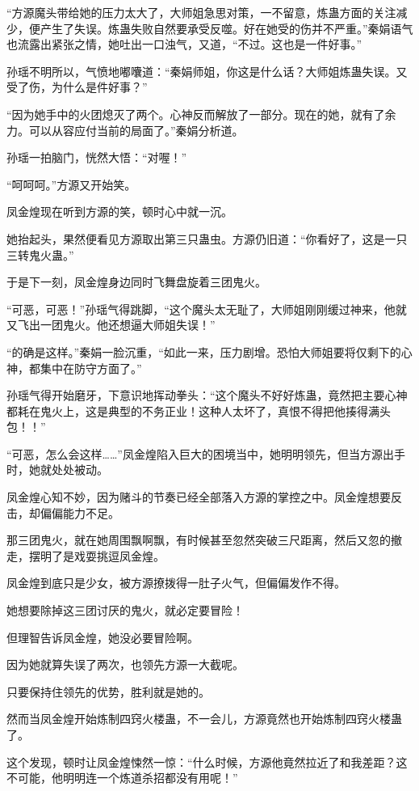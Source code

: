 \begin{this_body}
“方源魔头带给她的压力太大了，大师姐急思对策，一不留意，炼蛊方面的关注减少，便产生了失误。炼蛊失败自然要承受反噬。好在她受的伤并不严重。”秦娟语气也流露出紧张之情，她吐出一口浊气，又道，“不过。这也是一件好事。”

孙瑶不明所以，气愤地嘟囔道：“秦娟师姐，你这是什么话？大师姐炼蛊失误。又受了伤，为什么是件好事？”

“因为她手中的火团熄灭了两个。心神反而解放了一部分。现在的她，就有了余力。可以从容应付当前的局面了。”秦娟分析道。

孙瑶一拍脑门，恍然大悟：“对喔！”

“呵呵呵。”方源又开始笑。

凤金煌现在听到方源的笑，顿时心中就一沉。

她抬起头，果然便看见方源取出第三只蛊虫。方源仍旧道：“你看好了，这是一只三转鬼火蛊。”

于是下一刻，凤金煌身边同时飞舞盘旋着三团鬼火。

“可恶，可恶！”孙瑶气得跳脚，“这个魔头太无耻了，大师姐刚刚缓过神来，他就又飞出一团鬼火。他还想逼大师姐失误！”

“的确是这样。”秦娟一脸沉重，“如此一来，压力剧增。恐怕大师姐要将仅剩下的心神，都集中在防守方面了。”

孙瑶气得开始磨牙，下意识地挥动拳头：“这个魔头不好好炼蛊，竟然把主要心神都耗在鬼火上，这是典型的不务正业！这种人太坏了，真恨不得把他揍得满头包！！”

“可恶，怎么会这样……”凤金煌陷入巨大的困境当中，她明明领先，但当方源出手时，她就处处被动。

凤金煌心知不妙，因为赌斗的节奏已经全部落入方源的掌控之中。凤金煌想要反击，却偏偏能力不足。

那三团鬼火，就在她周围飘啊飘，有时候甚至忽然突破三尺距离，然后又忽的撤走，摆明了是戏耍挑逗凤金煌。

凤金煌到底只是少女，被方源撩拨得一肚子火气，但偏偏发作不得。

她想要除掉这三团讨厌的鬼火，就必定要冒险！

但理智告诉凤金煌，她没必要冒险啊。

因为她就算失误了两次，也领先方源一大截呢。

只要保持住领先的优势，胜利就是她的。

然而当凤金煌开始炼制四窍火楼蛊，不一会儿，方源竟然也开始炼制四窍火楼蛊了。

这个发现，顿时让凤金煌悚然一惊：“什么时候，方源他竟然拉近了和我差距？这不可能，他明明连一个炼道杀招都没有用呢！”


\end{this_body}
